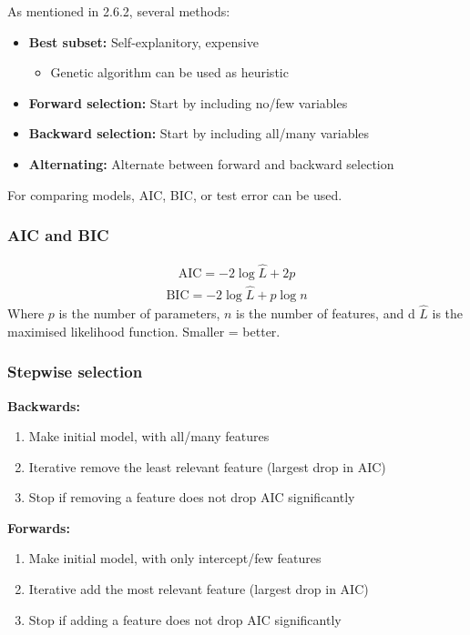 \documentclass{article}
\begin{document}
As mentioned in 2.6.2, several methods:
\begin{itemize}
    \item \textbf{Best subset:} Self-explanitory, expensive
    \begin{itemize}
        \item Genetic algorithm can be used as heuristic
    \end{itemize}
    \item \textbf{Forward selection:} Start by including no/few variables
    \item \textbf{Backward selection:} Start by including all/many variables
    \item \textbf{Alternating:} Alternate between forward and backward selection
\end{itemize}

For comparing models, AIC, BIC, or test error can be used.

\subsubsection{AIC and BIC}

\begin{align*}
    \text{AIC}=-2\log\hat{L}+2p
\end{align*}
\begin{align*}
    \text{BIC}=-2\log\hat{L}+p \log n
\end{align*}
Where $p$ is the number of parameters, $n$ is the number of features, and d $\hat{L}$ is the maximised likelihood function. Smaller = better.

\subsubsection{Stepwise selection}

\textbf{Backwards:}
\begin{enumerate}
    \item Make initial model, with all/many features
    \item Iterative remove the least relevant feature (largest drop in AIC)
    \item Stop if removing a feature does not drop AIC significantly
\end{enumerate}

\textbf{Forwards:}
\begin{enumerate}
    \item Make initial model, with only intercept/few features
    \item Iterative add the most relevant feature (largest drop in AIC)
    \item Stop if adding a feature does not drop AIC significantly
\end{enumerate}
\end{document}

